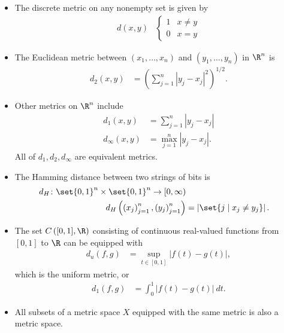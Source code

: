 \begin{example}
  \begin{itemize}
    \item The discrete metric on any nonempty set is given by
      \begin{align*}
        d\left(x,y\right) & \begin{cases}
          1 & x\neq y\\
          0 & x = y
        \end{cases}
      \end{align*}
    \item The Euclidean metric between $\left(x_1,\dots,x_n\right)$ and $\left(y_1,\dots,y_n\right)$ in $\R^n$ is
      \begin{align*}
        d_{2}\left(x,y\right) &= \left(\sum_{j=1}^{n}\left\vert y_j-x_j \right\vert^2\right)^{1/2}.
      \end{align*}
    \item Other metrics on $\R^n$ include
      \begin{align*}
        d_1\left(x,y\right) &= \sum_{j=1}^{n}\left\vert y_j-x_j \right\vert\\
        d_{\infty}\left(x,y\right) &= \max_{j=1}^{n}\left\vert y_j - x_j \right\vert.
      \end{align*}
      All of $d_1,d_2,d_{\infty}$ are equivalent metrics.
    \item The Hamming distance between two strings of bits is
      \begin{align*}
        d_{H}\colon \set{0,1}^{n}\times \set{0,1}^{n}\rightarrow [0,\infty)\\
        d_{H}\left(\left(x_{j}\right)_{j=1}^{n},\left(y_j\right)_{j=1}^{n}\right) &= \left\vert \set{j\mid x_j\neq y_j} \right\vert.
      \end{align*}
    \item The set $C\left([0,1],\R\right)$ consisting of continuous real-valued functions from $[0,1]$ to $\R$ can be equipped with
      \begin{align*}
        d_u\left(f,g\right) &= \sup_{t\in [0,1]}\left\vert f(t) - g(t) \right\vert,
      \end{align*}
      which is the uniform metric, or
      \begin{align*}
        d_{1}\left(f,g\right) &= \int_{0}^{1} \left\vert f(t)-g(t) \right\vert\:dt.
      \end{align*}
    \item All subsets of a metric space $X$ equipped with the same metric is also a metric space.

\end{itemize}
\end{example}
